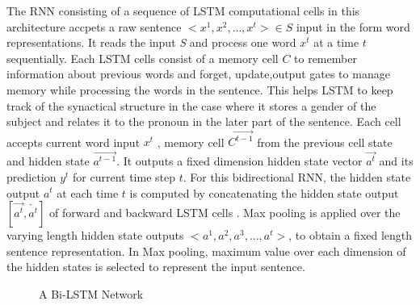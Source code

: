 \documentclass[12pt]{report} %
\begin{document}
	 The RNN consisting of a sequence of LSTM computational cells in this architecture accpets a raw sentence $<x^{1},x^{2},...,x^{t}> \in S$ input in the form word representations. It reads the input \textit{S} and process one word $x^{t}$ at a time $t$ sequentially. Each LSTM cells consist of a memory cell $C$ to remember information about previous words and forget, update,output gates to manage memory while processing the words in the sentence. This helps LSTM to keep track of the synactical structure in the case where it stores a gender of the subject and relates it to the pronoun in the later part of the sentence. Each cell accepts current word input $x^{t}$ , memory cell $\overrightarrow{C^{t-1}}$ from the previous cell state and hidden state $\overrightarrow{a^{t-1}}$. It outputs a fixed dimension hidden state vector $\overrightarrow{a^{t}}$ and its prediction $y^{t}$ for current time step $t$. For this bidirectional RNN, the hidden state output $ a^{t} $ at each time $ t $ is computed by concatenating the hidden state output $ [\overrightarrow{a^{t}},\overleftarrow{a^{t}}] $ of forward  and backward LSTM cells . Max pooling is applied over the varying length hidden state outputs $<a^{1},a^{2},a^{3},...,a^{t}> $, to obtain a fixed length sentence representation. In Max pooling, maximum value over each dimension of the hidden states is selected to represent the input sentence.
	
	\begin{figure}[!tbp]
		\centering
		\caption{A Bi-LSTM Network \citep{conneau2017supervised}}
		\label{bilstm}
	\end{figure}
	
\end{document}
